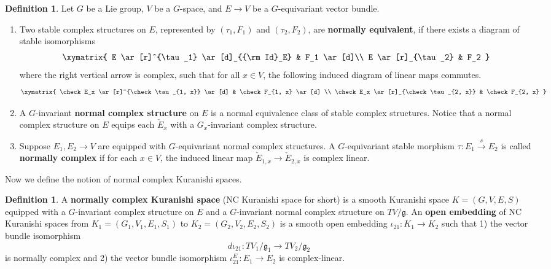 \documentclass[reqno, 10pt]{amsart}
\numberwithin{equation}{section}
\numberwithin{equation}{section}
\theoremstyle{definition}
\newtheorem{defn}[thm]{Definition}
\theoremstyle{remark}
\newcommand{\beqn}{\begin{equation*}}
\newcommand{\eeqn}{\end{equation*}}
\newcommand{\mf}{\mathfrak}
\begin{document}
\begin{defn}\label{defn_equivariant_NC_structure}
Let $G$ be a Lie group, $V$ be a $G$-space, and $E \to V$ be a $G$-equivariant vector bundle.
\begin{enumerate}
    \item Two stable complex structures on $E$, represented by $(\tau_1, F_1)$ and $(\tau_2, F_2)$, are {\bf normally equivalent}, if there exists a diagram of stable isomorphisms
    \beqn
    \xymatrix{ E \ar[r]^{\tau_1} \ar[d]_{{\rm Id}_E} &  F_1 \ar[d]\\
              E \ar[r]_{\tau_2}  & F_2  }
    \eeqn
    where the right vertical arrow is complex, such that for all $x \in V$, the following induced diagram of linear maps commutes.
    \beqn
    \xymatrix{ \check E_x \ar[r]^{\check \tau_{1, x}} \ar[d] & \check F_{1, x} \ar[d] \\
               \check E_x \ar[r]_{\check \tau_{2, x}} & \check F_{2, x} }
    \eeqn 

    \item A $G$-invariant {\bf normal complex structure} on $E$ is a normal equivalence class of stable complex structures. Notice that a normal complex structure on $E$ equips each $\check E_x$ with a $G_x$-invariant complex structure.

    \item Suppose $E_1, E_2 \to V$ are equipped with $G$-equivariant normal complex structures. A $G$-equivariant stable morphism $\tau: E_1 \overset{s}{\to} E_2$ is called {\bf normally complex} if for each $x \in V$, the induced linear map $\check E_{1, x} \to \check E_{2, x}$ is complex linear.
\end{enumerate}
\end{defn}

Now we define the notion of normal complex Kuranishi spaces. 

\begin{defn}\label{defn_NC_Kuranishi}
A {\bf normally complex Kuranishi space} (NC Kuranishi space for short) is a smooth Kuranishi space $K = (G, V, E, S)$ equipped with a $G$-invariant complex structure on $E$ and a $G$-invariant normal complex structure on $TV/{\mf g}$. An {\bf open embedding} of NC Kuranishi spaces from $K_1 = (G_1, V_1, E_1, S_1)$ to $K_2 = (G_2, V_2, E_2, S_2)$ is a smooth open embedding $\iota_{21}: K_1 \to K_2$ such that 1) the vector bundle isomorphism 
\beqn
d\iota_{21}: TV_1/{\mf g}_1 \to TV_2/{\mf g}_2
\eeqn
is normally complex and 2) the vector bundle isomorphism $\iota_{21}^E: E_1 \to E_2$ is complex-linear.
\end{defn}
\end{document}
